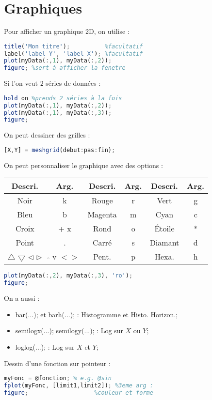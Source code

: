     \section{Graphiques}
        Pour afficher un graphique 2D, on utilise :
        \begin{lstlisting}[language=Octave]
title('Mon titre');          %facultatif
label('label Y', 'label X'); %facultatif
plot(myData(:,1), myData(:,2));
figure; %sert à afficher la fenetre
        \end{lstlisting}
        Si l'on veut 2 séries de données :
        \begin{lstlisting}[language=Octave]
hold on %prends 2 séries à la fois
plot(myData(:,1), myData(:,2));
plot(myData(:,1), myData(:,3));
figure; 
        \end{lstlisting}
        On peut dessiner des grilles :
        \begin{lstlisting}[language=Octave]
[X,Y] = meshgrid(debut:pas:fin);
        \end{lstlisting}
        On peut personnaliser le graphique avec des options :
        \begin{center}
            \begin{tabular}{| c | c ||  c | c || c | c |}
                \hline
                Descri. & Arg. & Descri. & Arg. & Descri. & Arg.\\
                \hline
                Noir & k & Rouge & r & Vert & g\\
                Bleu & b & Magenta & m & Cyan & c\\
                \hline
                Croix & + x & Rond & o & Étoile & *\\
                Point & . & Carré & s & Diamant & d\\
                $\bigtriangleup$ $\bigtriangledown$ $\lhd$ $\rhd$ & $\hat{ }$ v $< >$ & Pent. & p & Hexa. & h\\
                \hline
            \end{tabular}
        \end{center}
        \begin{lstlisting}[language=Octave]
plot(myData(:,2), myData(:,3), 'ro');
figure;
        \end{lstlisting}
        On a aussi :
        \begin{itemize}
            \item bar(...); et barh(...); : Histogramme et Histo. Horizon.;
            \item semilogx(...); semilogy(...); : Log sur $X$ ou $Y$;
            \item loglog(...); : Log sur $X$ et $Y$;
        \end{itemize}
        Dessin d'une fonction sur pointeur :
        \begin{lstlisting}[language=Octave]
myFonc = @fonction; % e.g. @sin
fplot(myFonc, [limit1,limit2]); %3eme arg :
figure;                   %couleur et forme
        \end{lstlisting}
